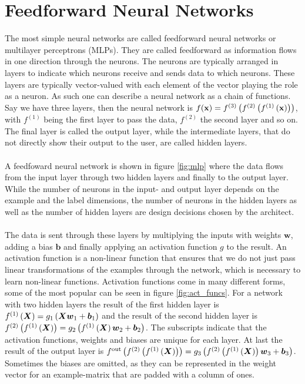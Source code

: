 \section{Feedforward Neural Networks} \label{sec:feedforward_nn}
The most simple neural networks are called feedforward neural networks or multilayer perceptrons (MLPs). They are called feedforward as information flows in one direction through the neurons. The neurons are typically arranged in layers to indicate which neurons receive and sends data to which neurons. These layers are typically vector-valued with each element of the vector playing the role as a neuron. As such one can describe a neural network as a chain of functions. Say we have three layers, then the neural network is $f(\mathbf{x}) = f^{(3)}\left (f^{(2)}\left (f^{(1)}\left (\mathbf{x}\right)\right)\right)$, with $f^{(1)}$ being the first layer to pass the data, $f^{(2)}$ the second layer and so on. The final layer is called the output layer, while the intermediate layers, that do not directly show their output to the user, are called hidden layers. \\
\\
A feedfoward neural network is shown in figure \ref{fig:mlp} where the data flows from the input layer through two hidden layers and finally to the output layer. While the number of neurons in the input- and output layer depends on the example and the label dimensions, the number of neurons in the hidden layers as well as the number of hidden layers are design decisions chosen by the architect. \\
\\
The data is sent through these layers by multiplying the inputs with weights $\boldsymbol{w}$, adding a bias $\boldsymbol{b}$ and finally applying an activation function $g$ to the result. An activation function is a non-linear function that ensures that we do not just pass linear transformations of the examples through the network, which is necessary to learn non-linear functions. Activation functions come in many different forms, some of the most popular can be seen in figure \ref{fig:act_funcs}. For a network with two hidden layers the result of the first hidden layer is $f^{(1)}\left (\boldsymbol{X}\right) = g_1 \left (\boldsymbol{X} \boldsymbol{w}_1 + \boldsymbol{b}_1\right)$ and the result of the second hidden layer is $f^{(2)} \left (f^{(1)}\left (\boldsymbol{X}\right)\right) = g_2 \left (f^{(1)}\left (\boldsymbol{X}\right) \boldsymbol{w}_2 + \boldsymbol{b}_2\right)$. The subscripts indicate that the activation functions, weights and biases are unique for each layer. At last the result of the output layer is $f^{\text{out}} \left (f^{(2)} \left (f^{(1)}\left (\boldsymbol{X}\right)\right)\right) = g_3 \left (f^{(2)} \left (f^{(1)}\left (\boldsymbol{X}\right)\right) \boldsymbol{w}_3 + \boldsymbol{b}_3\right)$. Sometimes the biases are omitted, as they can be represented in the weight vector for an example-matrix that are padded with a column of ones. \\
